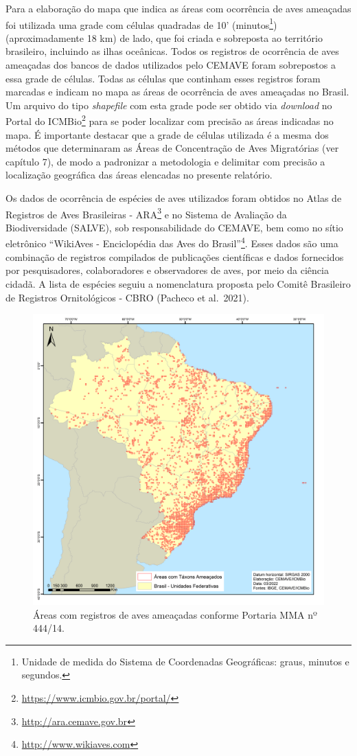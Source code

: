 \documentclass[
  oneside]{scrbook}
\DeclareRobustCommand{\href}[2]{#2\footnote{\url{#1}}}
\begin{document}
Para a elaboração do mapa que indica as áreas com ocorrência de aves ameaçadas foi utilizada uma grade com células quadradas de 10' (minutos\footnote{Unidade de medida do Sistema de Coordenadas Geográficas: graus, minutos e segundos.}) (aproximadamente 18 km) de lado, que foi criada e sobreposta ao território brasileiro, incluindo as ilhas oceânicas. Todos os registros de ocorrência de aves ameaçadas dos bancos de dados utilizados pelo CEMAVE foram sobrepostos a essa grade de células. Todas as células que continham esses registros foram marcadas e indicam no mapa as áreas de ocorrência de aves ameaçadas no Brasil. Um arquivo do tipo \emph{shapefile} com esta grade pode ser obtido via \emph{download} no \href{https://www.icmbio.gov.br/portal/}{Portal do ICMBio} para se poder localizar com precisão as áreas indicadas no mapa. É importante destacar que a grade de células utilizada é a mesma dos métodos que determinaram as Áreas de Concentração de Aves Migratórias (ver capítulo 7), de modo a padronizar a metodologia e delimitar com precisão a localização geográfica das áreas elencadas no presente relatório.

Os dados de ocorrência de espécies de aves utilizados foram obtidos no \href{http://ara.cemave.gov.br}{Atlas de Registros de Aves Brasileiras - ARA} e no Sistema de Avaliação da Biodiversidade (SALVE), sob responsabilidade do CEMAVE, bem como no sítio eletrônico \href{http://www.wikiaves.com}{``WikiAves - Enciclopédia das Aves do Brasil''}. Esses dados são uma combinação de registros compilados de publicações científicas e dados fornecidos por pesquisadores, colaboradores e observadores de aves, por meio da ciência cidadã. A lista de espécies seguiu a nomenclatura proposta pelo Comitê Brasileiro de Registros Ornitológicos - CBRO (Pacheco et al.~2021).

\begin{figure}[H]

{\centering \includegraphics[width=0.7\linewidth]{imagens/cap03/Figura_3.3} 

}

\caption{Áreas com registros de aves ameaçadas conforme Portaria MMA nº 444/14.}\label{fig:11}
\end{figure}
\end{document}
